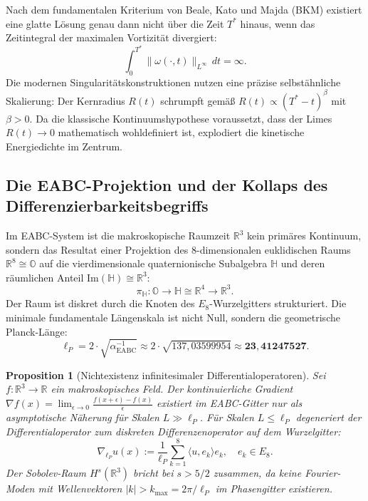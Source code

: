 \documentclass[11pt,a4paper]{article}
\newtheorem{proposition}[theorem]{Proposition}
\begin{document}
Nach dem fundamentalen Kriterium von Beale, Kato und Majda (BKM) existiert eine glatte Lösung genau dann nicht über die Zeit $T^*$ hinaus, wenn das Zeitintegral der maximalen Vortizität divergiert:
\begin{equation}
\int_0^{T^*} \|\omega(\cdot, t)\|_{L^\infty} \, dt = \infty.
\end{equation}
Die modernen Singularitätskonstruktionen nutzen eine präzise selbstähnliche Skalierung: Der Kernradius $R(t)$ schrumpft gemäß $R(t) \propto (T^* - t)^\beta$ mit $\beta > 0$. Da die klassische Kontinuumshypothese voraussetzt, dass der Limes $R(t) \to 0$ mathematisch wohldefiniert ist, explodiert die kinetische Energiedichte im Zentrum.

\subsection{Die EABC-Projektion und der Kollaps des Differenzierbarkeitsbegriffs}

Im EABC-System ist die makroskopische Raumzeit $\mathbb{R}^3$ kein primäres Kontinuum, sondern das Resultat einer Projektion des 8-dimensionalen euklidischen Raums $\mathbb{R}^8 \cong \mathbb{O}$ auf die vierdimensionale quaternionische Subalgebra $\mathbb{H}$ und deren räumlichen Anteil $\mathrm{Im}(\mathbb{H}) \cong \mathbb{R}^3$:
\begin{equation}
\pi_{\mathbb{H}}: \mathbb{O} \longrightarrow \mathbb{H} \cong \mathbb{R}^4 \longrightarrow \mathbb{R}^3.
\end{equation}
Der Raum ist diskret durch die Knoten des $E_8$-Wurzelgitters strukturiert. Die minimale fundamentale Längenskala ist nicht Null, sondern die geometrische Planck-Länge:
\begin{equation}
\ell_P = 2 \cdot \sqrt{\alpha^{-1}_{\mathrm{EABC}}} \approx 2 \cdot \sqrt{137{,}03599954} \approx \mathbf{23{,}41247527}.
\end{equation}

\begin{proposition}[Nichtexistenz infinitesimaler Differentialoperatoren]
Sei $f: \mathbb{R}^3 \to \mathbb{R}$ ein makroskopisches Feld. Der kontinuierliche Gradient $\nabla f(x) = \lim_{\epsilon \to 0} \frac{f(x+\epsilon) - f(x)}{\epsilon}$ existiert im EABC-Gitter nur als asymptotische Näherung für Skalen $L \gg \ell_P$. 
Für Skalen $L \le \ell_P$ degeneriert der Differentialoperator zum diskreten Differenzenoperator auf dem Wurzelgitter:
\begin{equation}
\nabla_{\ell_P} u(x) := \frac{1}{\ell_P} \sum_{k=1}^8 \langle u, e_k \rangle e_k, \quad e_k \in E_8.
\end{equation}
Der Sobolev-Raum $H^s(\mathbb{R}^3)$ bricht bei $s > 5/2$ zusammen, da keine Fourier-Moden mit Wellenvektoren $|k| > k_{\mathrm{max}} = 2\pi / \ell_P$ im Phasengitter existieren.
\end{proposition}
\end{document}
